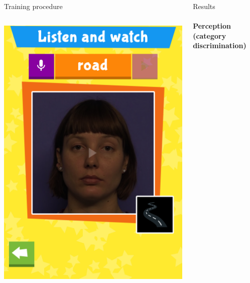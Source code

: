 \documentclass[final,xcolor={cmyk,hyperref}]{beamer}
\begin{document}
\begin{frame}[t]
\begin{columns}[t]
\begin{column}{0.45\linewidth}
\begin{block}{Training procedure}
\begin{columns}
\begin{column}{\screenshotwidth}
    \includegraphics[width=\linewidth]{images/CALVin-screenshots/jpgs/watch_example}
  \end{column}
\end{columns}
\end{block}

\end{column}
\begin{column}{0.5\linewidth}
\begin{block}{Results}
\paragraph{Perception (category discrimination)}

\medskip


\end{block}
\end{column}
\end{columns}
\end{frame}
\end{document}
